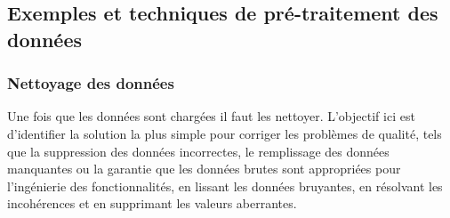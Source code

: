 \documentclass[a4paper, 12pt]{article}
\begin{document}
	\subsection{Exemples et techniques de pré-traitement des données}
	\subsubsection{	Nettoyage des données}Une fois que les données sont chargées il faut les nettoyer.
	L’objectif ici est d’identifier la solution la plus simple pour corriger les problèmes de qualité, tels que la suppression des données incorrectes, le remplissage des données manquantes ou la garantie que les données brutes sont appropriées pour l’ingénierie des fonctionnalités, en lissant les données bruyantes, en résolvant les incohérences et en supprimant les valeurs aberrantes.
\end{document}
